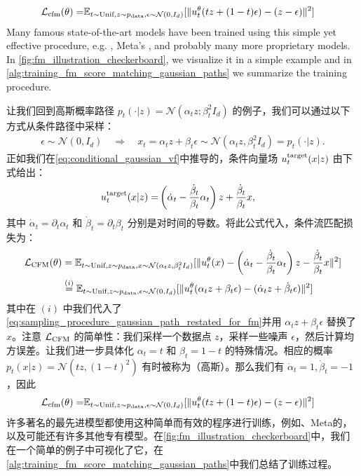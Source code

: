 \begin{examplebox}
\begin{align*}
        \mathcal{L}_{\text{cfm}}(\theta)=&\mathbb{E}_{t\sim\text{Unif},z\sim p_{\rm{data}}, \epsilon\sim \mathcal{N}(0,I_d)}[\|u_t^\theta(tz+(1-t)\epsilon)-(z-\epsilon)\|^2]
\end{align*}
Many famous state-of-the-art models have been trained using this simple yet effective procedure, e.g. , Meta's , and probably many more proprietary models. In \cref{fig:fm_illustration_checkerboard}, we visualize it in a simple example and in \cref{alg:training_fm_score_matching_gaussian_paths} we summarize the training procedure.

让我们回到高斯概率路径 $p_t(\cdot|z)=\mathcal{N}(\alpha_t z; \beta_t^2 I_d)$ 的例子，我们可以通过以下方式从条件路径中采样：
\begin{align}
\label{eq:sampling_procedure_gaussian_path_restated_for_fm}
    \epsilon\sim\mathcal{N}(0,I_d)\quad 
    \Rightarrow\quad x_t = \alpha_t z + \beta_t \epsilon \sim \mathcal{N}(\alpha_tz,\beta_t^2I_d)=p_t(\cdot|z).
\end{align}
正如我们在\cref{eq:conditional_gaussian_vf}中推导的，条件向量场 $u^{\text{target}}_t(x|z)$ 由下式给出：
\begin{align}
\label{e:marginal_vf_cond_score}
    u^{\text{target}}_t(x|z) =& \left(\dot{\alpha}_t-\frac{\dot{\beta}_t}{\beta_t}\alpha_t\right)z+\frac{\dot{\beta}_t}{\beta_t}x,
\end{align}
其中 $\dot{\alpha}_t=\partial_t\alpha_t$ 和 $\dot{\beta}_t=\partial_t\beta_t$ 分别是对时间的导数。将此公式代入，条件流匹配损失为：
\begin{align*}
\mathcal{L}_{\text{CFM}}(\theta) &= \mathbb{E}_{t\sim \text{Unif},z\sim p_{\rm{data}}, x\sim \mathcal{N}(\alpha_tz,\beta_t^2I_d)}[\lVert u_t^\theta(x)-\left(\dot{\alpha}_t-\frac{\dot{\beta}_t}{\beta_t}\alpha_t\right)z-\frac{\dot{\beta}_t}{\beta_t}x\rVert^2]\\&\overset{(i)}{=}\mathbb{E}_{t\sim\text{Unif},z\sim p_{\rm{data}}, \epsilon\sim \mathcal{N}(0,I_d)}[\|u_t^\theta(\alpha_tz+\beta_t\epsilon)-(\dot{\alpha}_tz+\dot{\beta}_t\epsilon)\|^2]
\end{align*}
其中在 $(i)$ 中我们代入了\cref{eq:sampling_procedure_gaussian_path_restated_for_fm}并用 $\alpha_tz+\beta_t\epsilon$ 替换了 $x$。注意 $\mathcal{L}_{\text{CFM}}$ 的简单性：我们采样一个数据点 $z$，采样一些噪声 $\epsilon$，然后计算均方误差。让我们进一步具体化 $\alpha_t=t$ 和 $\beta_t=1-t$ 的特殊情况。相应的概率 $p_t(x|z)=\mathcal{N}(tz,(1-t)^2)$ 有时被称为（高斯）。那么我们有 $\dot{\alpha}_t=1,\dot{\beta}_t=-1$，因此
\begin{align*}
        \mathcal{L}_{\text{cfm}}(\theta)=&\mathbb{E}_{t\sim\text{Unif},z\sim p_{\rm{data}}, \epsilon\sim \mathcal{N}(0,I_d)}[\|u_t^\theta(tz+(1-t)\epsilon)-(z-\epsilon)\|^2]
\end{align*}
许多著名的最先进模型都使用这种简单而有效的程序进行训练，例如、Meta的，以及可能还有许多其他专有模型。在\cref{fig:fm_illustration_checkerboard}中，我们在一个简单的例子中可视化了它，在\cref{alg:training_fm_score_matching_gaussian_paths}中我们总结了训练过程。
\end{examplebox}
